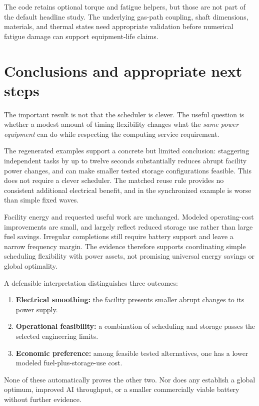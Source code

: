 \documentclass[11pt]{article}
\begin{document}
The code retains optional torque and fatigue helpers, but those are not
part of the default headline study. The underlying gas-path coupling,
shaft dimensions, materials, and thermal states need appropriate validation
before numerical fatigue damage can support equipment-life claims.

\section{Conclusions and appropriate next steps}

The important result is not that the scheduler is clever. The useful
question is whether a modest amount of timing flexibility changes what
the \emph{same power equipment} can do while respecting the computing
service requirement.

The regenerated examples support a concrete but limited conclusion:
staggering independent tasks by up to twelve seconds substantially
reduces abrupt facility power changes, and can make smaller tested
storage configurations feasible. This does not require a clever
scheduler. The matched reuse rule provides no consistent additional
electrical benefit, and in the synchronized example is worse than
simple fixed waves.

Facility energy and requested useful work are unchanged. Modeled
operating-cost improvements are small, and largely reflect reduced
storage use rather than large fuel savings. Irregular completions still
require battery support and leave a narrow frequency margin. The
evidence therefore supports coordinating simple scheduling flexibility
with power assets, not promising universal energy savings or global
optimality.

A defensible interpretation distinguishes three outcomes:
\begin{enumerate}
\item \textbf{Electrical smoothing:} the facility presents smaller abrupt
changes to its power supply.
\item \textbf{Operational feasibility:} a combination of scheduling and
storage passes the selected engineering limits.
\item \textbf{Economic preference:} among feasible tested alternatives,
one has a lower modeled fuel-plus-storage-use cost.
\end{enumerate}
None of these automatically proves the other two. Nor does any establish
a global optimum, improved AI throughput, or a smaller commercially
viable battery without further evidence.
\end{document}
